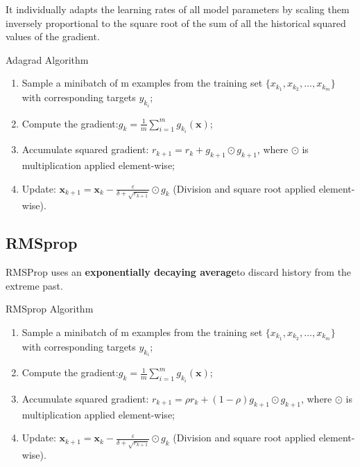 \documentclass[11pt]{article} %
\begin{document}
\begin{algorithm}[htb]
It individually adapts the learning rates of all model parameters by scaling them inversely proportional to the square root of the sum of all the historical squared values of the gradient.
\begin{algorithm}[htb]
\caption{Adagrad Algorithm}
\label{Adagrad}

  \begin{enumerate}
   \item Sample a minibatch of m examples from the training set $\{x_{k_1}, x_{k_2}, \dots, x_{k_m}\}$ with corresponding targets $y_{k_i}$;
   \item Compute the gradient:$g_{k} = \frac{1}{m}\sum_{i=1}^{m}g_{k_{i}}({\textbf{x}})$;
   \item Accumulate squared gradient: $r_{k+1}= r_k+ g_{k+1}\odot g_{k+1}$, where $\odot$ is multiplication applied element-wise;
   \item Update: ${\textbf{x}}_{k+1}={\textbf{x}}_k - \frac{\varepsilon}{\delta + \sqrt{r_{k+1}}}\odot g_k$ (Division and square root applied element-wise).
  \end{enumerate}
\end{algorithm}

\subsection{RMSprop}

RMSProp uses an \textbf{exponentially decaying average}to discard history from the extreme past.
\begin{algorithm}[htb]
\caption{RMSprop Algorithm}
\label{RMSprop}
  \begin{enumerate}
  \item Sample a minibatch of m examples from the training set $\{x_{k_1}, x_{k_2}, \dots, x_{k_m}\}$ with corresponding targets $y_{k_i}$;
  \item Compute the gradient:$g_{k} = \frac{1}{m}\sum_{i=1}^{m}g_{k_{i}}({\textbf{x}})$;
  \item Accumulate squared gradient: $r_{k+1}= \rho r_k+(1-\rho)g_{k+1}\odot g_{k+1}$, where $\odot$ is multiplication applied element-wise;
  \item Update: ${\textbf{x}}_{k+1}={\textbf{x}}_k - \frac{\varepsilon}{\delta + \sqrt{r_{k+1}}}\odot g_k$ (Division and square root applied element-wise).
\end{enumerate}


\end{algorithm}
\end{algorithm}
\end{document}
